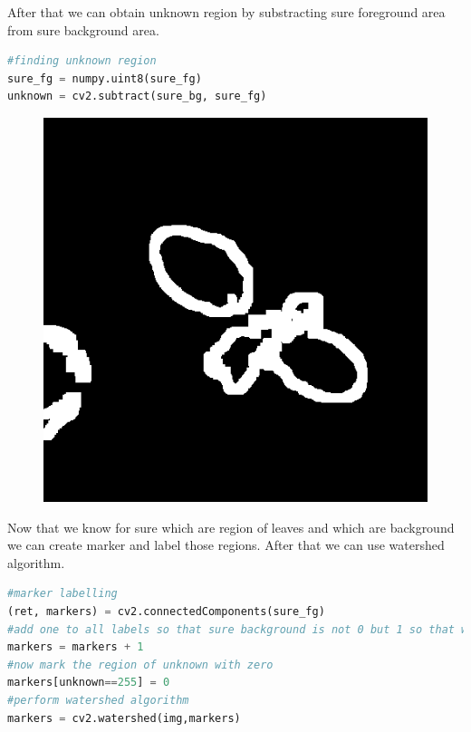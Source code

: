 \documentclass[10pt]{article}
\begin{document}
\clearpage
After that we can obtain unknown region by substracting sure foreground area from sure background area.
\begin{lstlisting}[language=Python]
#finding unknown region
sure_fg = numpy.uint8(sure_fg)
unknown = cv2.subtract(sure_bg, sure_fg)
\end{lstlisting}
\begin{figure}[H]
\includegraphics[width=\textwidth]{../example/unknown}
\end{figure}
\clearpage
Now that we know for sure which are region of leaves and which are background we can create marker and label those regions. After that we can use watershed algorithm.
\begin{lstlisting}[language=Python]
#marker labelling
(ret, markers) = cv2.connectedComponents(sure_fg)
#add one to all labels so that sure background is not 0 but 1 so that watershed algorithm won't consider it as unknown area
markers = markers + 1
#now mark the region of unknown with zero
markers[unknown==255] = 0
#perform watershed algorithm
markers = cv2.watershed(img,markers)
\end{lstlisting}
\end{document}

